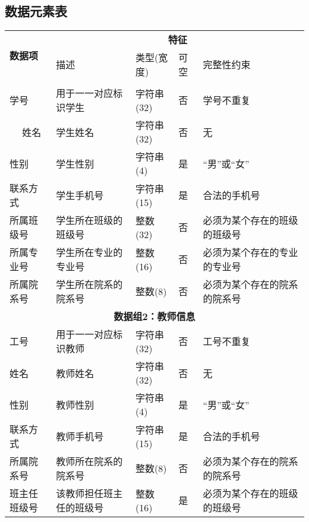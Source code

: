 \subsection{数据元素表}

\begin{center}
    \footnotesize
    \begin{longtable}{p{6em}p{16em}p{8em}p{2em}p{16em}}
        \toprule
        \multirow{2}{*}{\textbf{数据项}} &
            \multicolumn{4}{c}{\textbf{特征}} \\
        \cmidrule{2-5}
        & 描述 & 类型(宽度) & 可空 & 完整性约束 \\
        \midrule
        \endhead
        \bottomrule
        \endfoot

        \multicolumn{5}{c}{\textbf{数据组1：学生信息}} \\
        \midrule
        学号 & 用于一一对应标识学生 & 字符串(32) & 否 & 学号不重复 \\　
        姓名 & 学生姓名 & 字符串(32) & 否 & 无 \\
        性别 & 学生性别 & 字符串(4) & 是 & “男”或“女” \\
        联系方式 & 学生手机号 & 字符串(15) & 是 & 合法的手机号 \\
        所属班级号 & 学生所在班级的班级号 & 整数(32) & 否 & 必须为某个存在的班级的班级号 \\
        所属专业号 & 学生所在专业的专业号 & 整数(16) & 否 & 必须为某个存在的专业的专业号 \\
        所属院系号 & 学生所在院系的院系号 & 整数(8) & 否 & 必须为某个存在的院系的院系号 \\
        \midrule
        
        \multicolumn{5}{c}{\textbf{数据组2：教师信息}} \\
        \midrule
        工号 & 用于一一对应标识教师 & 字符串(32) & 否 & 工号不重复 \\
        姓名 & 教师姓名 & 字符串(32) & 否 & 无 \\
        性别 & 教师性别 & 字符串(4) & 是 & “男”或“女” \\
        联系方式 & 教师手机号 & 字符串(15) & 是 & 合法的手机号 \\
        所属院系号 & 教师所在院系的院系号 & 整数(8) & 否 & 必须为某个存在的院系的院系号 \\
        班主任班级号 & 该教师担任班主任的班级号 & 整数(16) & 是 & 必须为某个存在的班级的班级号 \\
        \midrule
        

\end{longtable}
\end{center}
